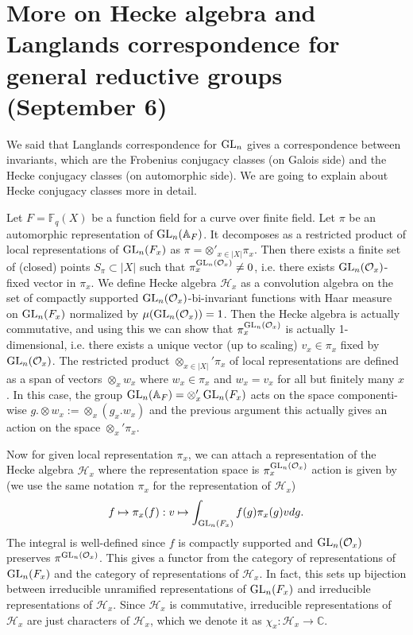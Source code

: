 \newpage
\section{More on Hecke algebra and Langlands correspondence for general reductive groups (September 6)}

We said that Langlands correspondence for $\operatorname{\mathrm{GL}}_{n}$ gives a correspondence between invariants,
which are the Frobenius conjugacy classes (on Galois side) and the Hecke conjugacy classes (on automorphic side).
We are going to explain about Hecke conjugacy classes more in detail.

Let $F = \mathbb{F}_{q}(X)$ be a function field for a curve over finite field.
Let $\pi$ be an automorphic representation of $\operatorname{\mathrm{GL}}_n(\mathbb{A}_F)$.
It decomposes as a restricted product of local representations of $\operatorname{\mathrm{GL}}_{n}(F_x)$ as $\pi = \otimes'_{x\in |X|}\pi_x$.
Then there exists a finite set of (closed) points $S_\pi \subset |X|$ such that
$\pi_{x}^{\operatorname{\mathrm{GL}}_{n}(\mathcal{O}_x)}\neq 0$, i.e. there exists $\operatorname{\mathrm{GL}}_{n}(\mathcal{O}_{x})$-fixed vector in $\pi_x$.
We define Hecke algebra $\mathcal{H}_x$ as a convolution algebra on the set of 
compactly supported $\operatorname{\mathrm{GL}}_{n}(\mathcal{O}_{x})$-bi-invariant functions with Haar measure on $\operatorname{\mathrm{GL}}_n(F_x)$
normalized by $\mu(\operatorname{\mathrm{GL}}_n(\mathcal{O}_x))=1$.
Then the Hecke algebra is actually commutative, and using this we can show that $\pi_x^{\operatorname{\mathrm{GL}}_n(\mathcal{O}_x)}$ is actually 1-dimensional,
i.e. there exists a unique vector (up to scaling) $v_x \in \pi_x$ fixed by $\operatorname{\mathrm{GL}}_n(\mathcal{O}_x)$.
The restricted product $\otimes_{x\in |X|}' \pi_x$ of local representations are defined as a span of vectors $\otimes_x w_x$
where $w_x\in \pi_x$ and $w_x = v_x$ for all but finitely many $x$.
In this case, the group $\operatorname{\mathrm{GL}}_n(\mathbb{A}_F) = \otimes_x' \operatorname{\mathrm{GL}}_n(F_x)$ acts on the space componenti-wise
$g.\otimes w_x := \otimes_x (g_x.w_x)$
and the previous argument this actually gives an action on the space $\otimes_{x}'\pi_x$.

Now for given local representation $\pi_x$, we can attach a representation of the Hecke algebra $\mathcal{H}_x$
where the representation space is $\pi_x^{\operatorname{\mathrm{GL}}_n(\mathcal{O}_x)}$ action is given by (we use the same notation $\pi_x$ for the representation of $\mathcal{H}_x$)
$$
f \mapsto \pi_x(f): v \mapsto \int_{\operatorname{\mathrm{GL}}_n(F_x)} f(g) \pi_x(g)v dg.
$$
The integral is well-defined since $f$ is compactly supported and $\operatorname{\mathrm{GL}}_n(\mathcal{O}_x)$ preserves $\pi^{\operatorname{\mathrm{GL}}_n(\mathcal{O}_x)}$.
This gives a functor from the category of representations of $\operatorname{\mathrm{GL}}_n(F_x)$ and the category of representations of $\mathcal{H}_x$.
In fact, this sets up bijection between irreducible unramified representations of $\operatorname{\mathrm{GL}}_n(F_x)$
and irreducible representations of $\mathcal{H}_x$.
Since $\mathcal{H}_x$ is commutative, irreducible representations of $\mathcal{H}_x$ are just characters of $\mathcal{H}_x$,
which we denote it as $\chi_x: \mathcal{H}_x \to \mathbb{C}$.

